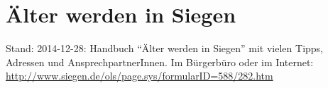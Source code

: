 \section{Älter werden in Siegen}
Stand: 2014-12-28: Handbuch \enquote{Älter werden in Siegen} mit vielen Tipps, Adressen und AnsprechpartnerInnen. Im Bürgerbüro oder im Internet:  \href{http://www.siegen.de/ols/page.sys/formularID=588/282.htm}{http://www.siegen.de/ols/page.sys/formularID=588/282.htm} 

